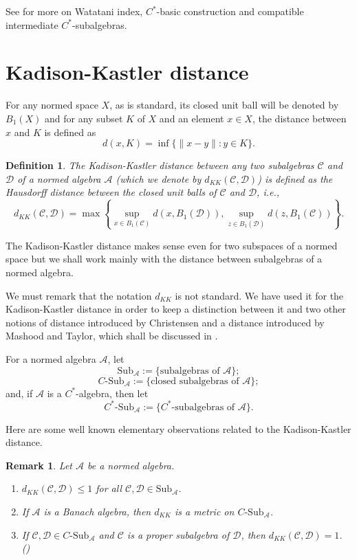 \documentclass{amsart}
\numberwithin{equation}{section}
\newcommand{\1}{\mathbf{1}}
\newcommand{\mA}{\mathcal{A}}
\newcommand{\mC}{\mathcal{C}}
\newcommand{\mD}{\mathcal{D}}
\newtheorem{definition}[theorem]{Definition}
\newtheorem{remark}[theorem]{Remark}
\begin{document}
See \cite{Wat, IW} for more on Watatani index,
$C^*$-basic construction and compatible intermediate $C^*$-subalgebras.






\section{Kadison-Kastler distance}\label{Kadison-Kastler}
For any normed space $X$, as is standard, its closed unit ball will be
denoted by $B_1(X)$ and for any subset $K$ of $X$ and an element $x
\in X$, the distance between $x$ and $K$ is defined as
\[
d(x, K) = \inf\{ \|x - y\|: y \in K\}.
\]


\begin{definition}  \cite{KK}
  The Kadison-Kastler distance between any two subalgebras $\mC$ and $\mD$
  of a normed algebra $\mA$ (which we denote by $d_{KK}(\mC,\mD)$) is
  defined as the Hausdorff distance between the closed unit balls of
  $\mC$ and $\mD$, i.e.,
\[
d_{KK}(\mC,\mD) = \max\left\{\sup_{x \in B_1(\mC)} d(x, B_1(\mD)), \sup_{z\in B_1(\mD)}d(z, B_1(\mC))\right\}.
\]
\end{definition}

The Kadison-Kastler distance makes sense even for two subspaces of a
normed space but we shall work mainly with the distance between
subalgebras of a normed algebra.


We must remark that the notation $d_{KK}$ is not standard. We have
used it for the Kadison-Kastler distance in order to keep a
distinction between it and two other notions of distance introduced by
Christensen and a distance introduced by Mashood and
Taylor, which shall be discussed in .


  For a normed algebra $\mA$,  let
\[
\mathrm{Sub}_{\mA} :=\big\{ \text{subalgebras of } \mA \big\}; 
\]
\[
C\text{-}\mathrm{Sub}_{\mA}:=\big\{ \text{closed subalgebras of } \mA\big\};
\]
and, if $\mA$ is a $C^*$-algebra, then let
\[
C^*\text{-}\mathrm{Sub}_{\mA} :=\big\{ C^*\text{-subalgebras of } \mA\big\}.
\]

Here are some well known elementary observations related to the
Kadison-Kastler distance.
\begin{remark}\label{basic-facts}
  Let $\mA$ be a normed algebra. 
\begin{enumerate}
\item $d_{KK}(\mC,\mD) \leq 1$ for all $\mC, \mD \in \mathrm{Sub}_{\mA}$.
\item If $\mA$ is a Banach algebra, then $d_{KK}$ is a metric on
  $C\text{-}\mathrm{Sub}_{\mA}$.

\item If $\mC, \mD \in C\text{-}\mathrm{Sub}_{\mA}$ and $\mC$ is a proper
  subalgebra of $\mD$, then $d_{KK}(\mC,\mD) =1$. (\cite[Lemma 2.1]{IW})
\end{enumerate}
\end{remark}
\end{document}
